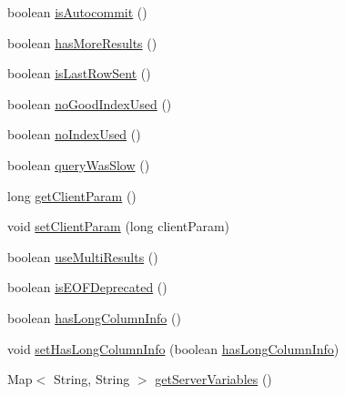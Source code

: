 \begin{DoxyCompactItemize}
\item 
boolean \mbox{\hyperlink{interfacecom_1_1mysql_1_1cj_1_1protocol_1_1_server_session_ab6c5390dc2b89ba2e41c6688523aef87}{is\+Autocommit}} ()
\item 
boolean \mbox{\hyperlink{interfacecom_1_1mysql_1_1cj_1_1protocol_1_1_server_session_a8bdf17d831029c823ce4277ffe3c3fd3}{has\+More\+Results}} ()
\item 
boolean \mbox{\hyperlink{interfacecom_1_1mysql_1_1cj_1_1protocol_1_1_server_session_a0c2296276bee98622e9bb340f9c7cb59}{is\+Last\+Row\+Sent}} ()
\item 
boolean \mbox{\hyperlink{interfacecom_1_1mysql_1_1cj_1_1protocol_1_1_server_session_affcc78ef2327efa3f81f7937ca3ca439}{no\+Good\+Index\+Used}} ()
\item 
boolean \mbox{\hyperlink{interfacecom_1_1mysql_1_1cj_1_1protocol_1_1_server_session_a94f56669636895e83594c8f0fc89817a}{no\+Index\+Used}} ()
\item 
boolean \mbox{\hyperlink{interfacecom_1_1mysql_1_1cj_1_1protocol_1_1_server_session_a120504f00410f183697ee1c5d3dbeddc}{query\+Was\+Slow}} ()
\item 
long \mbox{\hyperlink{interfacecom_1_1mysql_1_1cj_1_1protocol_1_1_server_session_a7c64dec4bc0e55be071abce45e3c2ef2}{get\+Client\+Param}} ()
\item 
void \mbox{\hyperlink{interfacecom_1_1mysql_1_1cj_1_1protocol_1_1_server_session_a25a797b7b770b843dfad239426ca0621}{set\+Client\+Param}} (long client\+Param)
\item 
boolean \mbox{\hyperlink{interfacecom_1_1mysql_1_1cj_1_1protocol_1_1_server_session_a7d92f74e5fe2cd93115d904f136b090b}{use\+Multi\+Results}} ()
\item 
boolean \mbox{\hyperlink{interfacecom_1_1mysql_1_1cj_1_1protocol_1_1_server_session_ac41728a86890f318604684f6d8e36635}{is\+E\+O\+F\+Deprecated}} ()
\item 
boolean \mbox{\hyperlink{interfacecom_1_1mysql_1_1cj_1_1protocol_1_1_server_session_a7b542c64c25cf2ebbc4c5709dd6bad80}{has\+Long\+Column\+Info}} ()
\item 
void \mbox{\hyperlink{interfacecom_1_1mysql_1_1cj_1_1protocol_1_1_server_session_a004d9939fa7471ce08e0b404363642fc}{set\+Has\+Long\+Column\+Info}} (boolean \mbox{\hyperlink{interfacecom_1_1mysql_1_1cj_1_1protocol_1_1_server_session_a7b542c64c25cf2ebbc4c5709dd6bad80}{has\+Long\+Column\+Info}})
\item 
Map$<$ String, String $>$ \mbox{\hyperlink{interfacecom_1_1mysql_1_1cj_1_1protocol_1_1_server_session_a0bd7485d9c76e0183247def27942a209}{get\+Server\+Variables}} ()

\end{DoxyCompactItemize}
